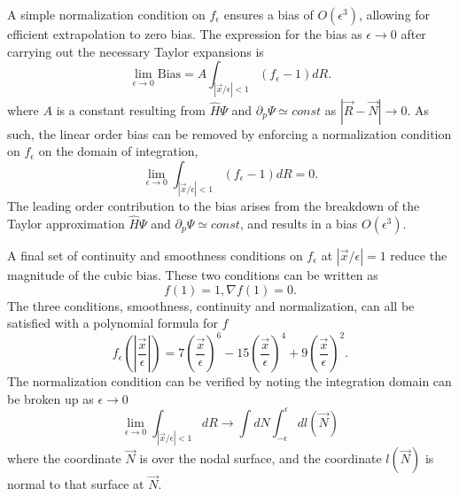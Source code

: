\documentclass[twocolumn]{revtex4-1}
\begin{document}
A simple normalization condition on $f_\epsilon$ ensures a bias of $O(\epsilon^3)$, allowing for efficient extrapolation to zero bias.
The expression for the bias as $\epsilon \rightarrow 0$ after carrying out the necessary Taylor expansions is
$$
\lim_{\epsilon\rightarrow 0}\text{Bias} =  A \int_{|\vec{x}/\epsilon|< 1} (f_\epsilon - 1) dR.
$$
where $A$ is a constant resulting from $\hat{H}\Psi$ and $\partial_p \Psi \simeq const$ as $|\vec{R}-\vec{N}|\rightarrow 0$.
As such, the linear order bias can be removed by enforcing a normalization condition on $f_\epsilon$ on the domain of integration, 
$$
\lim_{\epsilon\rightarrow 0} \int_{|\vec{x}/\epsilon|< 1} (f_\epsilon - 1) dR = 0.
$$
The leading order contribution to the bias arises from the breakdown of the Taylor approximation $\hat{H}\Psi$ and $\partial_p \Psi \simeq const$, and results in a bias $O(\epsilon^3)$.

A final set of continuity and smoothness conditions on $f_\epsilon$ at $|\vec{x}/\epsilon| = 1$ reduce the magnitude of the cubic bias.
These two conditions can be written as 
$$
f(1) = 1, \nabla f(1) = 0.
$$
The three conditions, smoothness, continuity and normalization, can all be satisfied with a polynomial formula for $f$
$$
f_\epsilon(|\frac{\vec{x}}{\epsilon}|) = 7(\frac{\vec{x}}{\epsilon})^6 - 15(\frac{\vec{x}}{\epsilon})^4 + 9(\frac{\vec{x}}{\epsilon})^2.
$$
The normalization condition can be verified by noting the integration domain can be broken up as $\epsilon \rightarrow 0$
$$
\lim_{\epsilon\rightarrow 0} \int_{|\vec{x}/\epsilon|< 1}  dR  \rightarrow \int dN \int_{-\epsilon}^{\epsilon} dl(\vec{N})
$$
where the coordinate $\vec{N}$ is over the nodal surface, and the coordinate $l(\vec{N})$ is normal to that surface at $\vec{N}$.
\end{document}
